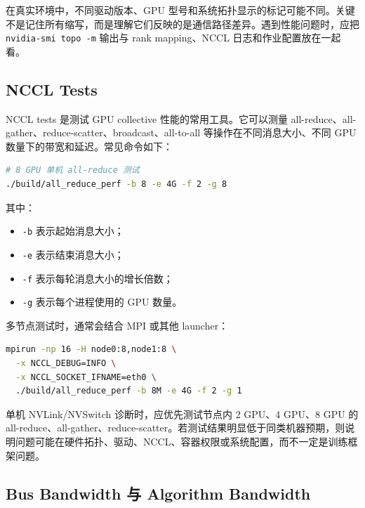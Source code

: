 在真实环境中，不同驱动版本、GPU 型号和系统拓扑显示的标记可能不同。关键不是记住所有缩写，而是理解它们反映的是通信路径差异。遇到性能问题时，应把 \texttt{nvidia-smi topo -m} 输出与 rank mapping、NCCL 日志和作业配置放在一起看。

\subsection{NCCL Tests}
\label{subsec:nccl-tests}

NCCL tests 是测试 GPU collective 性能的常用工具。它可以测量 all-reduce、all-gather、reduce-scatter、broadcast、all-to-all 等操作在不同消息大小、不同 GPU 数量下的带宽和延迟。常见命令如下：

\begin{lstlisting}[language=bash,caption={运行 NCCL all-reduce 性能测试的示例},label={lst:nccl-tests-allreduce}]
# 8 GPU 单机 all-reduce 测试
./build/all_reduce_perf -b 8 -e 4G -f 2 -g 8
\end{lstlisting}

其中：

\begin{itemize}
  \item \texttt{-b} 表示起始消息大小；
  \item \texttt{-e} 表示结束消息大小；
  \item \texttt{-f} 表示每轮消息大小的增长倍数；
  \item \texttt{-g} 表示每个进程使用的 GPU 数量。
\end{itemize}

多节点测试时，通常会结合 MPI 或其他 launcher：

\begin{lstlisting}[language=bash,caption={多节点 NCCL all-reduce 测试的概念示例},label={lst:nccl-tests-multinode}]
mpirun -np 16 -H node0:8,node1:8 \
  -x NCCL_DEBUG=INFO \
  -x NCCL_SOCKET_IFNAME=eth0 \
  ./build/all_reduce_perf -b 8M -e 4G -f 2 -g 1
\end{lstlisting}

单机 NVLink/NVSwitch 诊断时，应优先测试节点内 2 GPU、4 GPU、8 GPU 的 all-reduce、all-gather、reduce-scatter。若测试结果明显低于同类机器预期，则说明问题可能在硬件拓扑、驱动、NCCL、容器权限或系统配置，而不一定是训练框架问题。

\subsection{Bus Bandwidth 与 Algorithm Bandwidth}
\label{subsec:busbw-algbw}

